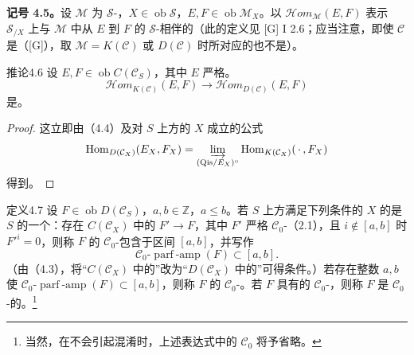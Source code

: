 \textbf{记号 4.5。}设 $\mathcal M$ 为 $\mathscr S$-，$X\in\operatorname{ob}\mathscr S$，$E,F\in\operatorname{ob}\mathcal M_X$。以 $\mathcal Hom_{\mathcal M}(E,F)$ 表示 $\mathscr S_{/X}$ 上与 $\mathcal M$ 中从 $E$ 到 $F$ 的 $\mathscr S$-相伴的（此的定义见 [G] I 2.6；应当注意，即使 $\mathcal C$ 是（[G]），取 $\mathcal M=K(\mathcal C)$ 或 $D(\mathcal C)$ 时所对应的也不是）。

\begin{SGAresult}{推论}{4.6}
设 $E,F\in\operatorname{ob}C(\mathcal C_S)$，其中 $E$ 严格。
\[\mathcal Hom_{K(\mathcal C)}(E,F)\longrightarrow\mathcal Hom_{D(\mathcal C)}(E,F)\]
是。
\end{SGAresult}
\begin{proof}
这立即由（4.4）及对 $S$ 上方的 $X$ 成立的公式
\[
\operatorname{Hom}_{D(\mathcal C_X)}(E_X,F_X)
=\varinjlim_{(\mathrm{Qis}/E_X)^\circ}\operatorname{Hom}_{K(\mathcal C_X)}(\,\cdot\,,F_X)
\]
得到。
\end{proof}

\begin{SGAresult}{定义}{4.7}
设 $F\in\operatorname{ob}D(\mathcal C_S)$，$a,b\in\mathbb Z$，$a\leq b$。若 $S$ 上方满足下列条件的 $X$ 的是 $S$ 的一个：存在
$C(\mathcal C_X)$ 中的 $F'\to F$，其中 $F'$ 严格 $\mathcal C_0$-（2.1），且 $i\notin[a,b]$ 时 $F'^i=0$，则称 $F$ 的 $\mathcal C_0$-包含于区间 $[a,b]$，并写作
\[\mathcal C_0\text{-}\operatorname{parf\!\! -amp}(F)\subset[a,b].\]
（由（4.3），将“$C(\mathcal C_X)$ 中的”改为“$D(\mathcal C_X)$ 中的”可得条件。）若存在整数 $a,b$ 使 $\mathcal C_0\text{-}\operatorname{parf\!\! -amp}(F)\subset[a,b]$，则称 $F$ 的 $\mathcal C_0$-。若 $F$ 具有的 $\mathcal C_0$-，则称 $F$ 是 $\mathcal C_0$-的。\footnote{当然，在不会引起混淆时，上述表达式中的 $\mathcal C_0$ 将予省略。}
\end{SGAresult}


